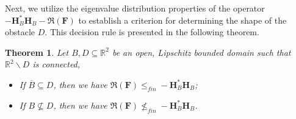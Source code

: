 \documentclass[11pt,reqno,twoside]{amsart}
\newtheorem{thm}{Theorem}[section]
\theoremstyle{definition}
\theoremstyle{remark}
\numberwithin{equation}{section}
\begin{document}
Next, we utilize the eigenvalue distribution properties of the operator $-\mathbf H^*_B\mathbf H_B-\Re\left(\mathbf F \right) $ to establish a criterion for determining the shape of the obstacle $D$. This decision rule is presented in the following theorem.
\begin{thm}\label{CharacterofObstacle}
	Let $B,D\subseteq \mathbb R^{2}$ be an open, Lipschitz bounded domain such that $\mathbb R^2\backslash D$ is connected,
	\begin{itemize}
		\item [(1).] If $\overline{B}\subseteq D$, then we have $\Re\left( \mathbf F\right) \leq_{fin} -\mathbf H^*_B\mathbf H_B$;
		\item [(2).] If $B\nsubseteq D$, then we have $\Re\left( \mathbf F\right) \nleq_{fin} -\mathbf H^*_B\mathbf H_B$.
	\end{itemize} 
\end{thm}
\end{document}
